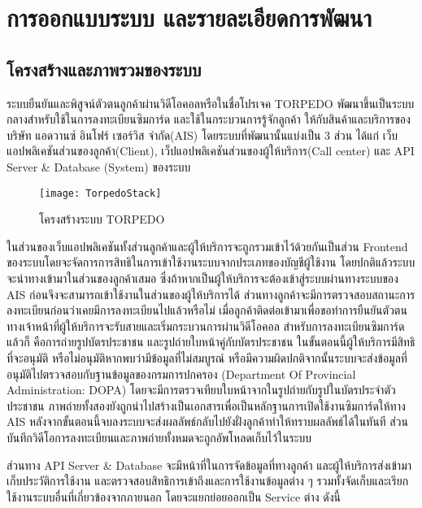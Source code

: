 \chapter{การออกแบบระบบ และรายละเอียดการพัฒนา}
\label{chapter:experiment}


\section{โครงสร้างและภาพรวมของระบบ}

ระบบยืนยันและพิสูจน์ตัวตนลูกค้าผ่านวิดีโอคอลหรือในชื่อโปรเจค TORPEDO พัฒนาขึ้นเป็นระบบกลางสำหรับใช้ในการลงทะเบียนซิมการ์ด และใช้ในกระบวนการรู้จักลูกค้า  ให้กับสินค้าและบริการของบริษัท แอดวานซ์ อินโฟร์ เซอร์วิส จำกัด(AIS) โดยระบบที่พัฒนานั้นแบ่งเป็น 3 ส่วน ได้แก่ เว็บแอปพลิเคชันส่วนของลูกค้า(Client), เว็ปแอปพลิเคชันส่วนของผู้ให้บริการ(Call center) และ API Server \& Database (System) ของระบบ 
\begin{figure}[h]
	\centering
	\texttt{[image: TorpedoStack]}
	\caption{โครงสร้างระบบ TORPEDO}
	\label{Fig:stack}
\end{figure}

ในส่วนของเว็บแอปพลิเคชันทั้งส่วนลูกค้าและผู้ให้บริการจะถูกรวมเข้าไว้ด้วยกันเป็นส่วน Frontend ของระบบโดยจะจัดการการสิทธิในการเข้าใช้งานระบบจากประเภทของบัญชีผู้ใช้งาน โดยปกติแล้วระบบจะนำทางเข้ามาในส่วนของลูกค้าเสมอ ซึ่งถ้าหากเป็นผู้ให้บริการจะต้องเข้าสู่ระบบผ่านทางระบบของ AIS ก่อนจึงจะสามารถเข้าใช้งานในส่วนของผู้ให้บริการได้ ส่วนทางลูกค้าจะมีการตรวจสอบสถานะการลงทะเบียนก่อนว่าเคยมีการลงทะเบียนไปแล้วหรือไม่ เมื่อลูกค้าติดต่อเข้ามาเพื่อขอทำการยืนยันตัวตน ทางเจ้าหน้าที่ผู้ให้บริการจะรับสายและเริ่มกระบวนการผ่านวิดีโอคอล สำหรับการลงทะเบียนซิมการ์ดแล้วก็ คือการถ่ายรูปบัตรประชาชน และรูปถ่ายใบหน้าคู่กับบัตรประชาชน ในขั้นตอนนี้ผู้ให้บริการมีสิทธิที่จะอนุมัติ หรือไม่อนุมัติหากพบว่ามีข้อมูลที่ไม่สมบูรณ์ หรือมีความผิดปกติจากนั้นระบบจะส่งข้อมูลที่อนุมัติไปตรวจสอบกับฐานข้อมูลของกรมการปกครอง (Department Of Provincial Administration: DOPA) โดยจะมีการตรวจเทียบใบหน้าจากในรูปถ่ายกับรูปในบัตรประจำตัวประชาชน ภาพถ่ายทั้งสองยังถูกนำไปสร้างเป็นเอกสารเพื่อเป็นหลักฐานการเปิดใช้งานซิมการ์ดให้ทาง AIS  หลังจากขั้นตอนนี้จบลงระบบจะส่งผลลัพธ์กลับไปยังฝั่งลูกค้าทำให้ทราบผลลัพธ์ได้ในทันที
ส่วนบันทึกวิดีโอการลงทะเบียนและภาพถ่ายทั้งหมดจะถูกอัพโหลดเก็บไว้ในระบบ

ส่วนทาง API Server \& Database จะมีหน้าที่ในการจัดข้อมูลที่ทางลูกค้า และผู้ให้บริการส่งเข้ามา เก็บประวัติการใช้งาน และตรวจสอบสิทธิการเข้าถึงและการใช้งานข้อมูลต่าง ๆ รวมทั้งจัดเก็บและเรียกใช้งานระบบอื่นที่เกี่ยวข้องจากภายนอก โดยจะแยกย่อยออกเป็น Service ต่าง ดังนี้
